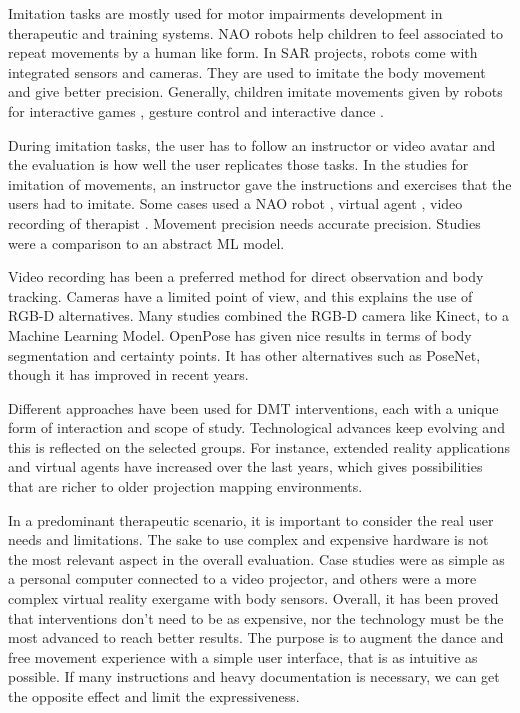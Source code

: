 \documentclass[a4paper,fleqn]{cas-sc}
\begin{document}
Imitation tasks are mostly used for motor impairments development in therapeutic and training systems. NAO robots help children to feel associated to repeat movements by a human like form.  In SAR projects, robots come with integrated sensors and cameras. They are used to imitate the body movement and give better precision. Generally, children imitate movements given by robots for interactive games \cite{Geminiani19, Santos20, Santos21}, gesture control \cite{DeCarolis21} and interactive dance \cite{Ascensao22}.

During imitation tasks, the user has to follow an instructor or video avatar and the evaluation is how well the user replicates those tasks. In the studies for imitation of movements, an instructor gave the instructions and exercises that the users had to imitate. Some cases used a NAO robot \cite{Santos20}, virtual agent \cite{Giraud21}, video recording of therapist \cite{Li21}. Movement precision needs accurate precision. Studies were a comparison to an abstract ML model.

Video recording has been a preferred method for direct observation and body tracking. Cameras have a limited point of view, and this explains the use of RGB-D alternatives. Many studies combined the RGB-D camera like Kinect, to a Machine Learning Model. OpenPose has given nice results in terms of body segmentation and certainty points. It has other alternatives such as PoseNet, though it has improved in recent years.

Different approaches have been used for DMT interventions, each with a unique form of interaction and scope of study. Technological advances keep evolving and this is reflected on the selected groups. For instance, extended reality applications and virtual agents have increased over the last years, which gives possibilities that are richer to older projection mapping environments.

In a predominant therapeutic scenario, it is important to consider the real user needs and limitations. The sake to use complex and expensive hardware is not the most relevant aspect in the overall evaluation. Case studies were as simple as a personal computer connected to a video projector, and others were a more complex virtual reality exergame with body sensors. Overall, it has been proved that interventions don’t need to be as expensive, nor the technology must be the most advanced to reach better results. The purpose is to augment the dance and free movement experience with a simple user interface, that is as intuitive as possible. If many instructions and heavy documentation is necessary, we can get the opposite effect and limit the expressiveness.
\end{document}
